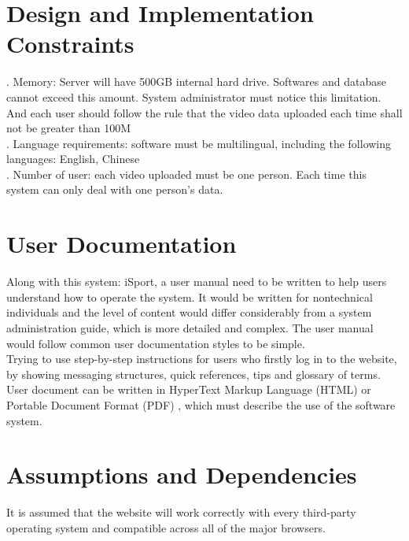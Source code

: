 \documentclass[16pt]{scrreprt}
\begin{document}
\section{Design and Implementation Constraints}

. Memory: Server will have 500GB internal hard drive. Softwares and database cannot exceed this amount. System administrator must notice this limitation. And each user should follow the rule that the video data uploaded each time shall not be greater than 100M\\


. Language requirements: software must be multilingual, including the following languages: English, Chinese\\


. Number of user: each video uploaded must be one person. Each time this system can only deal with one person's data.\\

\section{User Documentation}

Along with this system: iSport, a user manual need to be written to help users understand how to operate the system. It would be written for nontechnical individuals and the level of content would differ considerably from a system administration guide, which is more detailed and complex. The user manual would follow common user documentation styles to be simple.\\

Trying to use step-by-step instructions for users who firstly log in to the website, by showing messaging structures, quick references, tips and glossary of terms.\\

User document can be written in HyperText Markup Language (HTML) or Portable Document Format (PDF) , which must describe the use of the software system.

\section{Assumptions and Dependencies}

It is assumed that the website will work correctly with every third-party operating
system and compatible across all of the major browsers.\\
\end{document}
